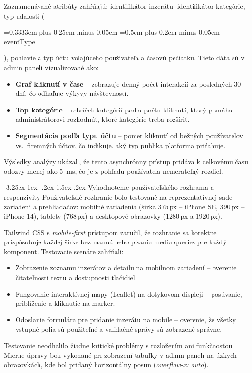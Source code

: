 \documentclass[12pt]{article}
\makeatletter
\newcommand{\hlcode}[1]{%
  \allowbreak
  \begingroup
  \setlength{\fboxsep}{2.4pt}%
  \setlength{\fboxrule}{0pt}%
  \colorbox{gray!15}{%
    \strut
    {\ttfamily\small
     \hyphenpenalty=10000
     \exhyphenpenalty=10000
     \spaceskip=0.3333em plus 0.25em minus 0.05em
     \xspaceskip=0.5em plus 0.2em minus 0.05em
     #1}%
  }%
  \endgroup
  \allowbreak
}
\renewcommand{\subsection}{\@startsection{subsection}{2}{\z@}%
  {-3.25ex\@plus -1ex \@minus -.2ex}%
  {1.5ex \@plus .2ex}%
  {\normalfont\large\bfseries}}
\makeatother
\begin{document}
Zaznamenávané atribúty zahŕňajú: identifikátor inzerátu, identifikátor kategórie, typ udalosti (\hlcode{eventType}), pohlavie a typ účtu volajúceho používateľa a časovú pečiatku. Tieto dáta sú v admin paneli vizualizované ako:
\begin{itemize}
  \item \textbf{Graf kliknutí v čase} -- zobrazuje denný počet interakcií za posledných 30 dní, čo odhaľuje výkyvy návštevnosti.
  \item \textbf{Top kategórie} -- rebríček kategórií podľa počtu kliknutí, ktorý pomáha administrátorovi rozhodnúť, ktoré kategórie treba rozšíriť.
  \item \textbf{Segmentácia podľa typu účtu} -- pomer kliknutí od bežných používateľov vs.\ firemných účtov, čo indikuje, aký typ publika platforma priťahuje.
\end{itemize}

Výsledky analýzy ukázali, že tento asynchrónny prístup pridáva k celkovému času odozvy menej ako 5~ms, čo je z pohľadu používateľa nemerateľný rozdiel.

\subsection{Vyhodnotenie používateľského rozhrania a responzivity}
\noindent
Používateľské rozhranie bolo testované na reprezentatívnej sade zariadení a prehliadačov: mobilné zariadenia (šírka 375\,px -- iPhone SE, 390\,px -- iPhone 14), tablety (768\,px) a desktopové obrazovky (1280\,px a 1920\,px).

Tailwind CSS s \emph{mobile-first} prístupom zaručil, že rozhranie sa korektne prispôsobuje každej šírke bez manuálneho písania media queries pre každý komponent. Testovacie scenáre zahŕňali:
\begin{itemize}
  \item Zobrazenie zoznamu inzerátov a detailu na mobilnom zariadení -- overenie čitateľnosti textu a dostupnosti tlačidiel.
  \item Fungovanie interaktívnej mapy (Leaflet) na dotykovom displeji -- posúvanie, priblíženie a kliknutie na marker.
  \item Odoslanie formulára pre pridanie inzerátu na mobile -- overenie, že všetky vstupné polia sú použiteľné a validačné správy sú zobrazené správne.
\end{itemize}

Testovanie neodhalilo žiadne kritické problémy s rozložením ani funkčnosťou. Mierne úpravy boli vykonané pri zobrazení tabuľky v admin paneli na úzkych obrazovkách, kde bol pridaný horizontálny posun (\emph{overflow-x: auto}).
\end{document}
